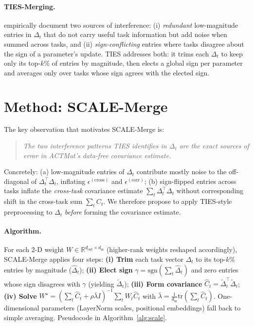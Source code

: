 \documentclass{article} %
\newcommand{\ws}{W^\star}
\begin{document}
\paragraph{TIES-Merging.} \citet{yadav2023tiesmerging} empirically document two sources of interference: (i) \emph{redundant} low-magnitude entries in $\Delta_t$ that do not carry useful task information but add noise when summed across tasks, and (ii) \emph{sign-conflicting} entries where tasks disagree about the sign of a parameter's update. TIES addresses both: it trims each $\Delta_t$ to keep only its top-$k\%$ of entries by magnitude, then elects a global sign per parameter and averages only over tasks whose sign agrees with the elected sign.

\section{Method: SCALE-Merge}
\label{sec:method}

The key observation that motivates SCALE-Merge is:
\begin{quote}\emph{The two interference patterns TIES identifies in $\Delta_t$ are the exact sources of error in ACTMat's data-free covariance estimate.}\end{quote}

Concretely: (a) low-magnitude entries of $\Delta_t$ contribute mostly noise to the off-diagonal of $\Delta_t^\top \Delta_t$, inflating $\epsilon^{(\text{cross})}$ and $\epsilon^{(\text{corr})}$; (b) sign-flipped entries across tasks inflate the \emph{cross-task} covariance estimate $\sum_t \Delta_t^\top \Delta_t$ without corresponding shift in the cross-task sum $\sum_t C_t$. We therefore propose to apply TIES-style preprocessing to $\Delta_t$ \emph{before} forming the covariance estimate.

\paragraph{Algorithm.} For each 2-D weight $W\in\mathbb{R}^{d_\text{out}\times d_\text{in}}$ (higher-rank weights reshaped accordingly), SCALE-Merge applies four steps: \textbf{(i) Trim} each task vector $\Delta_t$ to its top-$k\%$ entries by magnitude ($\hat\Delta_t$); \textbf{(ii) Elect sign} $\gamma=\mathrm{sgn}(\sum_t \hat\Delta_t)$ and zero entries whose sign disagrees with $\gamma$ (yielding $\tilde\Delta_t$); \textbf{(iii) Form covariance} $\hat C_t = \tilde\Delta_t^\top\tilde\Delta_t$; \textbf{(iv) Solve} $\ws = (\sum_t\hat C_t + \rho\bar\lambda I)^{-1}\sum_t W_t\hat C_t$ with $\bar\lambda = \tfrac{1}{d_\text{in}}\mathrm{tr}(\sum_t\hat C_t)$. One-dimensional parameters (LayerNorm scales, positional embeddings) fall back to simple averaging. Pseudocode in Algorithm~\ref{alg:scale}.
\end{document}
